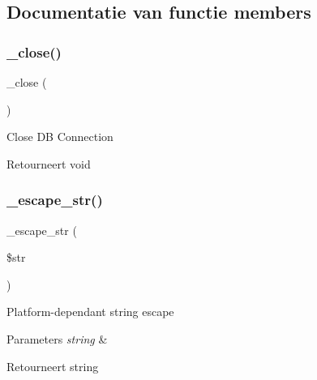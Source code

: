 \subsection{Documentatie van functie members}
\mbox{\label{class_c_i___d_b__sqlite__driver_a4d9082658000e5ede8312067c6dda9db}} 
\subsubsection{\texorpdfstring{\_close()}{\_close()}}
{\footnotesize\ttfamily \+\_\+close (\begin{DoxyParamCaption}{ }\end{DoxyParamCaption})\hspace{0.3cm}{\ttfamily [protected]}}

Close DB Connection

\begin{DoxyReturn}{Retourneert}
void 
\end{DoxyReturn}
\mbox{\label{class_c_i___d_b__sqlite__driver_af8ef0237bfcdb19215b63fff769e7a55}} 
\subsubsection{\texorpdfstring{\_escape\_str()}{\_escape\_str()}}
{\footnotesize\ttfamily \+\_\+escape\+\_\+str (\begin{DoxyParamCaption}\item[{}]{\$str }\end{DoxyParamCaption})\hspace{0.3cm}{\ttfamily [protected]}}

Platform-\/dependant string escape


\begin{DoxyParams}{Parameters}
{\em string} & \\
\hline
\end{DoxyParams}
\begin{DoxyReturn}{Retourneert}
string 
\end{DoxyReturn}
\mbox{\label{class_c_i___d_b__sqlite__driver_a114ab675d89bf8324a41785fb475e86d}} 
